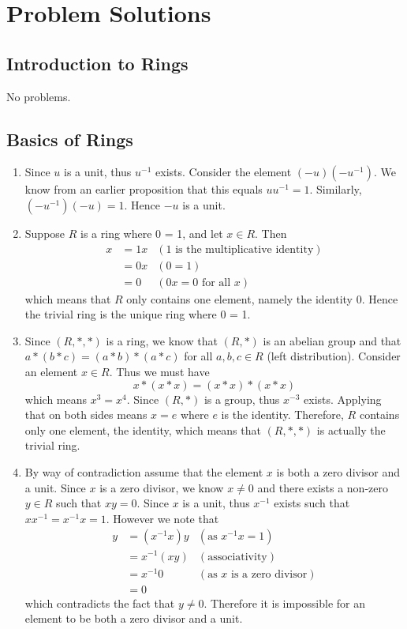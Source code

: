 \chapter{Problem Solutions}
\section{Introduction to Rings}
No problems.

\section{Basics of Rings}
\begin{enumerate}
    \item Since $u$ is a unit, thus $u^{-1}$ exists. Consider the element $(-u)(-u^{-1})$. We know from an earlier proposition that this equals $uu^{-1} = 1$. Similarly, $(-u^{-1})(-u) = 1$. Hence $-u$ is a unit.

    \item Suppose $R$ is a ring where 0 = 1, and let $x \in R$. Then
    \begin{align*}
        x &= 1x & (1 \text{ is the multiplicative identity})\\
        &= 0x & (0 = 1)\\
        &= 0 & (0x = 0 \text{ for all }x)
    \end{align*}
    which means that $R$ only contains one element, namely the identity 0. Hence the trivial ring is the unique ring where 0 = 1.

    \item Since $(R, \ast, \ast)$ is a ring, we know that $(R, \ast)$ is an abelian group and that $a \ast(b\ast c) = (a \ast b) \ast (a \ast c)$ for all $a, b, c \in R$ (left distribution). Consider an element $x \in R$. Thus we must have
    \[
        x \ast (x \ast x) = (x \ast x) \ast (x \ast x)    
    \]
    which means $x^3 = x^4$. Since $(R, \ast)$ is a group, thus $x^{-3}$ exists. Applying that on both sides means $x = e$ where $e$ is the identity. Therefore, $R$ contains only one element, the identity, which means that $(R, \ast, \ast)$ is actually the trivial ring.

    \item By way of contradiction assume that the element $x$ is both a zero divisor and a unit. Since $x$ is a zero divisor, we know $x \neq 0$ and there exists a non-zero $y \in R$ such that $xy = 0$. Since $x$ is a unit, thus $x^{-1}$ exists such that $xx^{-1} = x^{-1}x = 1$. However we note that
    \begin{align*}
        y &= (x^{-1}x)y & (\text{as }x^{-1}x = 1)\\
        &= x^{-1}(xy) & (\text{associativity})\\
        &= x^{-1}0 & (\text{as }x \text{ is a zero divisor})\\
        &= 0
    \end{align*}
    which contradicts the fact that $y \neq 0$. Therefore it is impossible for an element to be both a zero divisor and a unit.


\end{enumerate}
